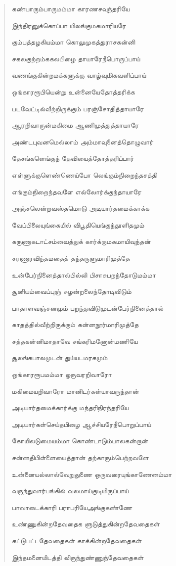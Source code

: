 \documentclass{article}
\begin{document}
\begin{quotation}
{கண்பாரும்பாருமம்மா காரணசவுந்தரியே

இந்திரனுக்கொப்பா யிலங்குமகமாரியரே

கும்பத்தழகியம்மா கொலுமுகத்துராசகன்னி

சகலகுற்றம்ககலபிழை தாயாரேநீபொருப்பாய்

வணங்குகின்றமக்களுக்கு வாழ்வுமிகவளிப்பாய்

ஒங்காரரூபியென்று உன்னையேதோத்தரிக்க

படவேட்டில்வீற்றிருக்கும் பரஞ்சோதித்தாயாரே

ஆரறிவாருன்மகிமை ஆணிமுத்துத்தாயாரே

அண்டபுவனமெல்லாம் அம்மாவுனைத்தொழுவார்

தேசங்களெங்குந் தேவியைத்தோத்தரிப்பார்

எள்ளுக்குளெண்ணெய்போ லெங்கும்நிறைந்தசத்தி

எங்கும்நிறைந்தவளே எல்லாேர்க்குந்தாயாரே

அஞ்சலென்றவஸ்தமொடு அடியார்தமைக்காக்க

வேப்பிலையுங்கையில் விபூதியெங்குந்தூளிதமும்

கருணாகடாட்சம்வைத்துக் கார்க்குமகமாயிவுந்தன்

சரணாரவிந்தமதைத் தந்தருளுமாரிமுத்தே

உன்பேர்நினைத்தால்பில்லி பிசாசுபறந்தோடுமம்மா

சூனியம்வைப்புஞ் சுழன்றலைந்தோடிவிடும்

பாதாளவஞ்சனமும் பறந்துவிடுமுடன்பேர்நினைத்தால்

காதத்தில்வீற்றிருக்கும்‌ கன்னநூர்மாரிமுத்தே

சத்தகன்னிமாதாவே சங்கரிமனோன்மணியே

சூலங்கபாலமுடன் துய்யடமரகமும்

ஒங்காரரூபமம்மா ஒருவரறிவாரோ

மகிமையறிவாரோ மானிடர்கள்யாவருந்தான்

அடியார்தமைக்கார்க்கு மந்தரிநிரந்தரியே

அடியார்கள்செய்தபிழை ஆச்சியரேநீபொறுப்பாய்

கோயிலடுமையம்மா கொண்டாடும்பாலகன்றான்

சன்னதிபிள்ளையைத்தான் தற்காரும்பெற்றவளே

உன்னையல்லால்வேறுதுணை ஒருவரையுங்காணேனம்மா

வருந்துவார்பங்கில் வலமாய்குடியிருப்பாய்

பாவாடைக்காரி பராபரியேஅங்குகண்ணே

உண்ணுகின்றதேவதைக ளுடுத்துகின்றதேவதைகள்

கட்டுபட்டதேவதைகள் காக்கின்றதேவதைகள்

இந்தமனையிடத்தி லிருந்துண்ணுந்தேவதைகள்

}
\end{quotation}
\end{document}
